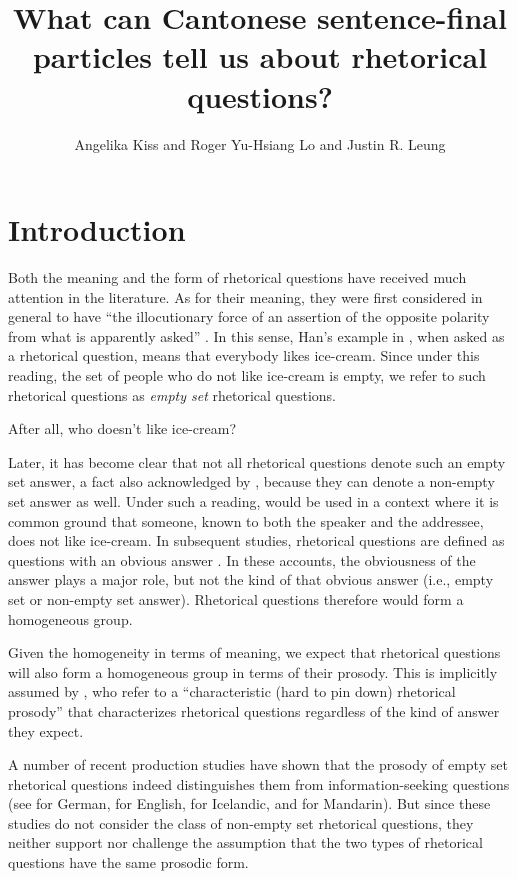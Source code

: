 \documentclass[output=paper,colorlinks,citecolor=brown            ,chinesefont]{langscibook}
\author{Angelika Kiss\orcid{0000-0001-8064-3687}\affiliation{University of Toronto} and Roger Yu-Hsiang Lo\orcid{0000-0003-3652-7384}\affiliation{University of British Columbia} and Justin R. Leung\orcid{0000-0003-4780-9424}\affiliation{University of Toronto}}
\title[Cantonese sentence-final particles \& rhetorical questions]{What can Cantonese sentence-final particles tell us about rhetorical questions?}
\begin{document}
\maketitle

\section{Introduction}

Both the meaning and the form of rhetorical questions have received much attention in the literature. As for their meaning, they were first considered in general to have ``the illocutionary force of an assertion of the opposite polarity from what is apparently asked'' \citep[201]{Han2002}. In this sense, Han's example in , when asked as a rhetorical question, means that everybody likes ice-cream. Since under this reading, the set of people who do not like ice-cream is empty, we refer to such rhetorical questions as \textit{empty set} rhetorical questions.

\begin{exe}
\ex\label{opposite} After all, who doesn't like ice-cream? \hfill \citep[12]{Caponigro+2007}
\end{exe}

Later, it has become clear that not all rhetorical questions denote such an empty set answer, a fact also acknowledged by \citet[fn 6]{Han2002}, because they can denote a non-empty set answer as well. Under such a reading,  would be used in a context where it is common ground that someone, known to both the speaker and the addressee, does not like ice-cream. In subsequent studies, rhetorical questions are defined as questions with an obvious answer \citep{Rohde2006, Caponigro+2007, Biezma+2017}. In these accounts, the obviousness of the answer plays a major role, but not the kind of that obvious answer (i.e., empty set or non-empty set answer). Rhetorical questions therefore would form a homogeneous group.

Given the homogeneity in terms of meaning, we expect that rhetorical questions will also form a homogeneous group in terms of their prosody. This is implicitly assumed by \citet{Biezma+2017}, who refer to a ``characteristic (hard to pin down) rhetorical prosody'' that characterizes rhetorical questions regardless of the kind of answer they expect.

A number of recent production studies have shown that the prosody of empty set rhetorical questions indeed distinguishes them from information-seeking questions (see \citealt{Braun+2018} for German, \citealt{Dehe+2019} for English, \citealt{Dehe+2020} for Icelandic, and \citealt{Zahner+2020} for Mandarin). But since these studies do not consider the class of non-empty set rhetorical questions, they neither support nor challenge the assumption that the two types of rhetorical questions have the same prosodic form.
\end{document}
